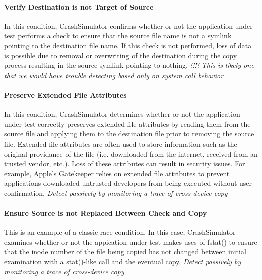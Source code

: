         \paragraph{Verify Destination is not Target of Source}

        In this condition, CrashSimulator confirms whether or not the application under test performs a check to ensure
        that the source file name is not a symlink pointing to the destination file name.  If this check is not
        performed, loss of data is possible due to removal or overwriting of the destination during the copy process
        resulting in the source symlink pointing to nothing. \emph{!!!! This is likely one that we would have trouble
          detecting based only on system call behavior}

        \paragraph{Preserve Extended File Attributes}

        In this condition, CrashSimulator determines whether or not the application under test correctly preserves
        extended file attributes by reading them from the source file and applying them to the destination file prior to
        removing the source file.  Extended file attributes are often used to store information such as the original
        providance of the file (i.e. downloaded from the internet, received from an trusted vendor, etc.).  Loss of
        these attributes can result in security issues. For example, Apple's Gatekeeper relies on extended file
        attributes to prevent applications downloaded untrusted developers from being executed without user
        confirmation. \emph{Detect passively by monitoring a trace of cross-device copy}


        \paragraph{Ensure Source is not Replaced Between Check and Copy}

        This is an example of a classic race condition.  In this case, CrashSimulator examines whether or not the
        appication under test makes uses of fstat() to ensure that the inode number of the file being copied has not
        changed between initial examination with a stat()-like call and the eventual copy. \emph{Detect passively by
          monitoring a trace of cross-device copy}

